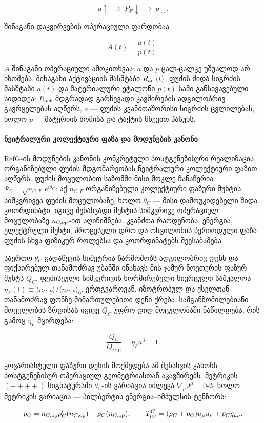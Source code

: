 \documentclass[11pt,a4paper]{article}
\begin{document}
\[
a\uparrow \;\longrightarrow\; P_F\downarrow \;\longrightarrow\; p\downarrow.
\]

შინაგანი დაკვირვების ოპერაციული ფარდობაა

\[
A(t)=\frac{a(t)}{p(t)}.
\]

$A$ შინაგანი ოპერაციული ამოკითხვაა; $a$ და $p$ ცალ-ცალკე უშუალოდ არ იზომება. შინაგანი აქტივაციის მასშტაბი $R_{\rm act}(t)$, ფუძის შიდა სიგრძის მასშტაბი $a(t)$ და მატერიალური ეტალონი $p(t)$ სამი განსხვავებული სიდიდეა: $R_{\rm act}$ მდგრადად გარჩევადი კავშირების ადგილობრივ გავრცელებას აღწერს, $a$ — ფუძის კვანძთაშორისი სიგრძის ცვლილებას, ხოლო $p$ — მატერიის ზომისა და ტაქტის წნევით პასუხს.

\paragraph{ნეიტრალური კოლექტიური ფაზა და მოდუნების კანონი}

RefG-ის მოდუნების კანონის კონკრეტული პოსტგენეზისური რეალიზაცია ორგანიზებული ფუძის მდგომარეობას ნეიტრალური კოლექტიური ფაზით აღწერს. ფუძის მოცულობით საზომში მისი მოკლე ჩანაწერია $\Psi_C=\sqrt{n_{C,F}}\,e^{i\theta_C}$: აქ $n_{C,F}$ ორგანიზებული კოლექტიური ფაზური მუხტის სიმკვრივეა ფუძის მოცულობაზე, ხოლო $\theta_C$ — მისი დამოუკიდებელი შიდა კოორდინატი. იგივე შენახვადი მუხტის სიმკვრივე ოპერაციულ მოცულობაზე $n_{C,{\rm op}}$-ით აღინიშნება. კვანძთა რაოდენობა, ენერგია, ელექტრული მუხტი, პროცესული დრო და ოსცილონის პერიოდული ფაზა ფუძის სხვა ფიზიკურ როლებსა და კოორდინატებს შეესაბამება.

საერთო $\theta_C$-გადაწევის სიმეტრია წარმოშობს ადგილობრივ დენს და ფიქსირებულ თანამოძრავ უბანში ინახავს მის ჯამურ ნოეთერის ფაზურ მუხტს $Q_C$. ფუძისეული სიმკვრივის ნორმირებული სივრცული საშუალოა $\eta_F(t)\equiv\langle n_{C,F}\rangle/\langle n_{C,F}\rangle_0$. ერთგვაროვან, იზოტროპულ და ქსელთან თანამოძრავ ფონზე მიმართულებითი დენი ქრება. სამგანზომილებიანი მოცულობის ზრდისას იგივე $Q_C$ უფრო დიდ მოცულობაში ნაწილდება, რის გამოც $\eta_F$ მცირდება:

\[
\frac{Q_C}{Q_{C,0}}=\eta_F a^3=1.
\]

კოვარიანტული ფაზური დენის მოქმედება ამ შენახვის კანონს პოსტგენეზისურ ოპერაციულ გეომეტრიასთან აკავშირებს. მეტრიკის $(-+++)$ სიგნატურაში $\theta_C$-ის ვარიაცია იძლევა $\nabla_\mu J^\mu=0$-ს, ხოლო მეტრიკის ვარიაცია — ჰილბერტის ენერგია–იმპულსის ტენზორს:

\[
p_C=n_{C,{\rm op}}\rho_C'(n_{C,{\rm op}})-\rho_C(n_{C,{\rm op}}),\qquad
T^C_{\mu\nu}=(\rho_C+p_C)u_\mu u_\nu+p_Cg_{\mu\nu}.
\]
\end{document}
